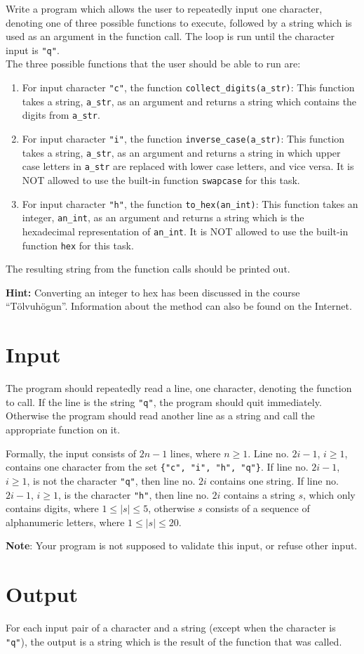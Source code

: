 
Write a program which allows the user to repeatedly input one character, denoting one of three possible functions to execute, followed by a string which is used as an argument in the function call.
The loop is run until the character input is \texttt{"q"}. \\

The three possible functions that the user should be able to run are: 
\begin{enumerate} 
    \item For input character \texttt{"c"}, the function \texttt{collect\_digits(a\_str)}: This function takes a string, \texttt{a\_str}, as an argument and returns a string which contains the digits from \texttt{a\_str}.
    \item For input character \texttt{"i"}, the function \texttt{inverse\_case(a\_str)}: This function takes a string, \texttt{a\_str}, as an argument and returns a string in which upper case letters in \texttt{a\_str} are replaced with lower case letters, and vice versa. It is NOT allowed to use the built-in function \texttt{swapcase} for this task.
    \item For input character \texttt{"h"}, the function \texttt{to\_hex(an\_int)}: This function takes an integer, \texttt{an\_int}, as an argument and returns a string which is the hexadecimal representation of \texttt{an\_int}. It is NOT allowed to use the built-in function \texttt{hex} for this task.
\end{enumerate}

The resulting string from the function calls should be printed out.

\noindent
\textbf{Hint:} Converting an integer to hex has been discussed in the course ``Tölvuhögun''.
Information about the method can also be found on the Internet.

\section*{Input}
The program should repeatedly read a line, one character, denoting the function to call.
If the line is the string \texttt{"q"}, the program should quit immediately.
Otherwise the program should read another line as a string and call the appropriate function on it.

Formally, the input consists of $2n-1$ lines, where $n \ge 1$. 
Line no. $2i-1$, $i \ge 1$, contains one character from the set \texttt{\{"c", "i", "h", "q"\}}. 
If line no. $2i-1$, $i \ge 1$, is not the character \texttt{"q"}, then line no. $2i$ contains one string. 
If line no. $2i-1$, $i \ge 1$, is the character \texttt{"h"}, then line no. $2i$ contains a string $s$, which only contains digits, where $1 \le |s| \le 5$, otherwise $s$ consists of a sequence of alphanumeric letters, where $1 \le |s| \le 20$. 

\textbf{Note}: Your program is not supposed to validate this input, or refuse other input.

\section*{Output}
For each input pair of a character and a string (except when the character is \texttt{"q"}), the output is a string which is the result of the function that was called.
